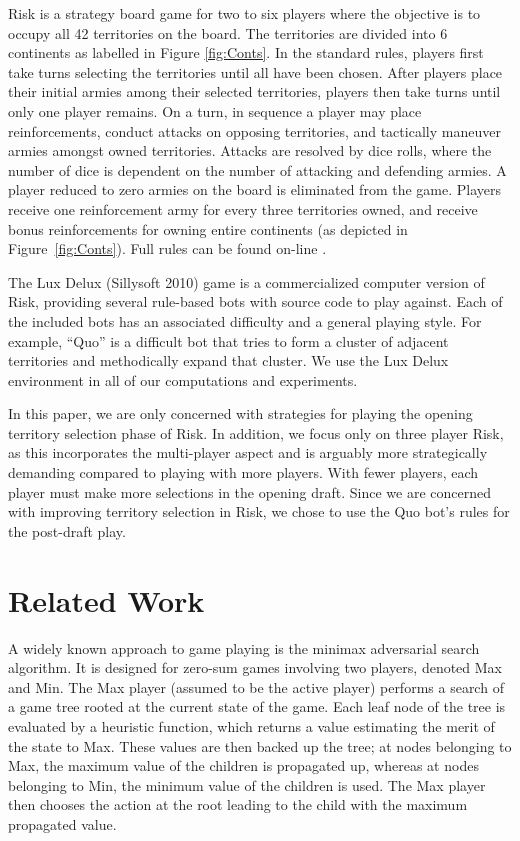 \documentclass[letterpaper]{article}
\numberwithin{equation}{section}
\numberwithin{theorem}{section}
\numberwithin{lemma}{section}
\numberwithin{df}{section}
\begin{document}
Risk is a strategy board game for two to six players where the objective is to occupy all 42 territories on the board.  The territories are divided into 6 continents as labelled in Figure \ref{fig:Conts}.  In the standard rules, players first take turns selecting the territories until all have been chosen.  After players place their initial armies among their selected territories, players then take turns until only one player remains.  On a turn, in sequence a player may place reinforcements, conduct attacks on opposing territories, and tactically maneuver armies amongst owned territories.  Attacks are resolved by dice rolls, where the number of dice is dependent on the number of attacking and defending armies.  A player reduced to zero armies on the board is eliminated from the game.  Players receive one reinforcement army for every three territories owned, and receive bonus reinforcements for owning entire continents (as depicted in Figure~\ref{fig:Conts}). %
Full rules can be found on-line \cite{Risk}.

The Lux Delux (Sillysoft 2010) \nocite{Lux} %
game is a commercialized computer version of Risk, providing several rule-based bots with source code to play against.  Each of the included bots has an associated difficulty and a general playing style.  For example, ``Quo'' is a difficult bot that tries to form a cluster of adjacent territories and methodically expand that cluster.  We use the Lux Delux environment in all of our computations and experiments.  

In this paper, we are only concerned with strategies for playing the opening territory selection phase of Risk.  In addition, we focus only on three player Risk, as this incorporates the multi-player aspect and is arguably more strategically demanding compared to playing with more players.  With fewer players, each player must make more selections in the opening draft.  Since we are concerned with improving territory selection in Risk, we chose to use the Quo bot's rules for the post-draft play. 

\section{Related Work}

A widely known approach to game playing is the minimax adversarial search algorithm.  It is designed for zero-sum games involving two players, denoted Max and Min.  The Max player (assumed to be the active player) performs a search of a game tree rooted at the current state of the game.  Each leaf node of the tree is evaluated by a heuristic function, which returns a value estimating the merit of the state to Max.  These values are then backed up the tree; at nodes belonging to Max, the maximum value of the children is propagated up, whereas at nodes belonging to Min, the minimum value of the children is used.  The Max player then chooses the action at the root leading to the child with the maximum propagated value.
\end{document}

